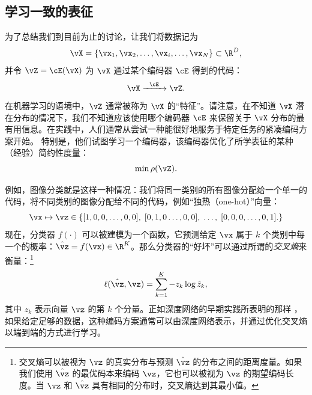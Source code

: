 \documentclass[../../book-main_zh.tex]{subfiles}
\begin{document}
\subsection{学习一致的表征}

\label{sec:consistency}

为了总结我们到目前为止的讨论，让我们将数据记为
\begin{equation}
    \vX = \{\vx_{1}, \vx_{2}, \ldots, \vx_{i}, \ldots, \vx_{N}\} \subset \R^{D},
\end{equation}
并令 \(\vZ = \cE(\vX)\) 为 \(\vX\) 通过某个编码器 \(\cE\) 得到的代码：
\begin{equation}
    \vX  \xrightarrow{\hspace{2mm} \cE\hspace{2mm}} \vZ.
    \label{eqn:open-loop}
\end{equation}
在机器学习的语境中，\(\vZ\) 通常被称为 \(\vX\) 的“特征”。请注意，在不知道 \(\vX\)
潜在分布的情况下，我们不知道应该使用哪个编码器 \(\cE\) 来保留关于 \(\vX\)
分布的最有用信息。在实践中，人们通常从尝试一种能很好地服务于特定任务的紧凑编码方案开始。
特别是，他们试图学习一个编码器，该编码器优化了所学表征的某种（经验）简约性度量：
\begin{equation}
    \min \rho(\vZ).
\end{equation}

\begin{example}\label{example:image_classification_feature_learning}
    例如，图像分类就是这样一种情况：我们将同一类别的所有图像分配给一个单一的代码，将不同类别的图像分配给不同的代码，例如“独热（one-hot）”向量：
    \begin{equation}
        \vx \mapsto \vz \in \{  [1, 0, 0, \ldots , 0, 0], \;  [0, 1,
        0 \ldots, 0, 0], \; \ldots, \;  [0,0,0, \ldots, 0, 1].\}
        \label{eqn:class-labels}
    \end{equation}
    现在，分类器 \(f(\cdot)\) 可以被建模为一个函数，它预测给定 \(\vx\) 属于 \(k\)
    个类别中每一个的概率：\(\hat{\vz} = f(\vx) \in
    \R^{K}\)。那么分类器的“好坏”可以通过所谓的{\em 交叉熵}来衡量：\footnote{交叉熵可以被视为 \(\vz\)
        的真实分布与预测 \(\hat{\vz}\) 的分布之间的距离度量。如果我们使用 \(\hat{\vz}\) 的最优码本来编码
        \(\vz\)，它也可以被视为 \(\vz\) 的期望编码长度。当 \(\vz\) 和 \(\hat{\vz}\)
    具有相同的分布时，交叉熵达到其最小值。}
    \begin{equation}
        \ell(\hat{\vz}, \vz) = \sum_{k=1}^{K} - z_{k} \log \hat{z}_{k},
    \end{equation}
    其中 \(z_{k}\) 表示向量 \(\vz\) 的第 \(k\) 个分量。正如深度网络的早期实践所表明的那样
    \cite{krizhevsky2012imagenet}，如果给定足够的数据，这种编码方案通常可以由深度网络表示，并通过优化交叉熵以端到端的方式进行学习。
\end{example}
\end{document}
